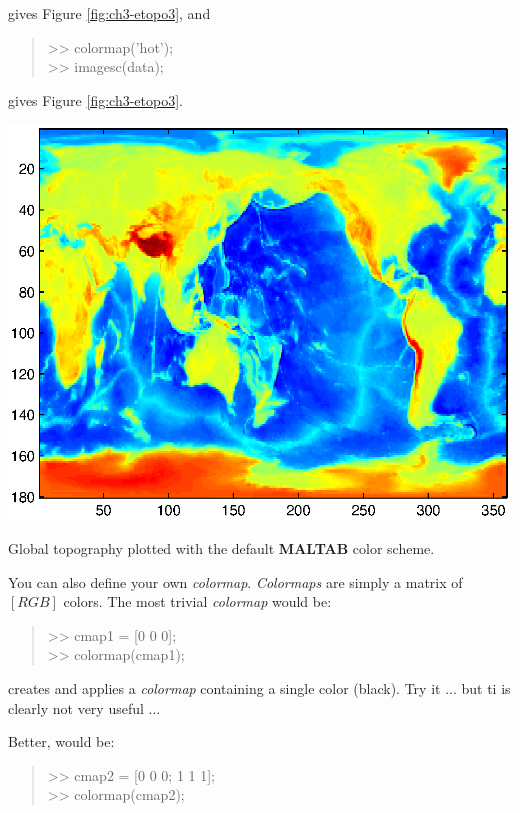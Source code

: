 \documentclass{tufte-book} %
\newenvironment{docspec}{\begin{quotation}\ttfamily\parskip0pt\parindent0pt\ignorespaces}{\end{quotation}}
\begin{document}
\noindent gives Figure \ref{fig:ch3-etopo3}, and

\begin{docspec}
>> colormap('hot');\\
>> imagesc(data);
\end{docspec}

\noindent gives Figure \ref{fig:ch3-etopo3}.

\begin{marginfigure}[0.0in]
\includegraphics[width=\linewidth]{ch3-etopo3.eps}
\caption{Global topography plotted with the default \textbf{MALTAB} color scheme.}
\label{fig:ch3-etopo3}
\end{marginfigure}

You can also define your own \textit{colormap}. \textit{Colormaps} are simply a matrix of \([R G B]\) colors. The most trivial \textit{colormap} would be:

\begin{docspec}
>> cmap1 = [0 0 0];\\
>> colormap(cmap1);
\end{docspec}

\noindent creates and applies a \textit{colormap} containing a single color (black). Try it ... but ti is clearly not very useful ...

Better, would be:

\begin{docspec}
>> cmap2 = [0 0 0; 1 1 1];\\
>> colormap(cmap2);
\end{docspec}
\end{document}
